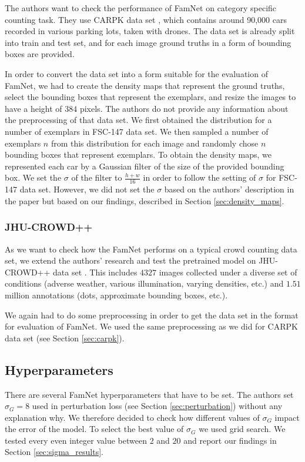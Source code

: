 The authors want to check the performance of FamNet on category specific counting task. They use CARPK data set \cite{hsieh2017drone}, which contains around 90,000 cars recorded in various parking lots, taken with drones. The data set is already split into train and test set, and for each image ground truths in a form of bounding boxes are provided.

In order to convert the data set into a form suitable for the evaluation of FamNet, we had to create the density maps that represent the ground truths, select the bounding boxes that represent the exemplars, and resize the images to have a height of $384$ pixels. The authors do not provide any information about the preprocessing of that data set.
We first obtained the distribution for a number of exemplars in FSC-147 data set. We then sampled a number of exemplars $n$ from this distribution for each image and randomly chose $n$ bounding boxes that represent exemplars. To obtain the density maps, we represented each car by a Gaussian filter of the size of the provided bounding box. We set the $\sigma$ of the filter to $ \frac{h+w}{16} $ in order to follow the setting of $\sigma$ for FSC-147 data set. However, we did not set the $\sigma$ based on the authors' description in the paper but based on our findings, described in Section \ref{sec:density_maps}.

\subsubsection{JHU-CROWD++}
\label{sec:crowd}
As we want to check how the FamNet performs on a typical crowd counting data set, we extend the authors' research and test the pretrained model on JHU-CROWD++ data set \cite{sindagi2019pushing, sindagi2020jhu-crowd++}. This includes $4327$ images collected under a diverse set of conditions (adverse weather, various illumination, varying densities, etc.) and $1.51$ million annotations (dots, approximate bounding boxes, etc.).

We again had to do some preprocessing in order to get the data set in the format for evaluation of FamNet. We used the same preprocessing as we did for CARPK data set (see Section \ref{sec:carpk}).

\subsection{Hyperparameters}

There are several FamNet hyperparameters that have to be set. The authors set $\sigma_G = 8$ used in perturbation loss (see Section \ref{sec:perturbation}) without any explanation why. We therefore decided to check how different values of $\sigma_G$ impact the error of the model. To select the best value of $\sigma_G$ we used grid search. We tested every even integer value between $2$ and $20$ and report our findings in Section \ref{sec:sigma_results}.

